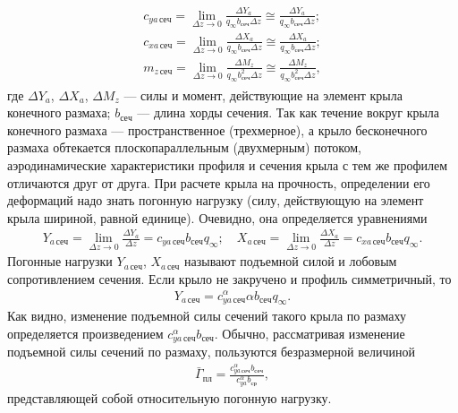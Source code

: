 	\begin{gather}\label{eq:3.7}
		\begin{gathered}
			c_{ya\,\mathrm{сеч}} = \lim_{\Delta z \to 0}\frac{\Delta Y_a}{q_\infty b_\mathrm{сеч}\Delta z} \cong \frac{\Delta Y_a}{q_\infty b_\mathrm{сеч}\Delta z};\\
			c_{xa\,\mathrm{сеч}} = \lim_{\Delta z \to 0}\frac{\Delta X_a}{q_\infty b_\mathrm{сеч}\Delta z} \cong \frac{\Delta X_a}{q_\infty b_\mathrm{сеч}\Delta z};\\
			m_{z\,\mathrm{сеч}} = \lim_{\Delta z \to 0}\frac{\Delta M_z}{q_\infty b_\mathrm{сеч}^2\Delta z} \cong \frac{\Delta M_z}{q_\infty b_\mathrm{сеч}^2\Delta z},
		\end{gathered}
	\end{gather}
	где $\Delta Y_a$, $\Delta X_a$, $\Delta M_z$ --- силы и момент, действующие на элемент крыла конечного размаха; $b_\mathrm{сеч}$ --- длина хорды сечения.\n
	Так как течение вокруг крыла конечного размаха --- пространственное (трехмерное), а крыло бесконечного размаха обтекается плоскопараллельным (двухмерным) потоком, аэродинамические характеристики профиля и сечения крыла с тем же профилем отличаются друг от друга.\n
	При расчете крыла на прочность, определении его деформаций надо знать погонную нагрузку (силу, действующую на элемент крыла шириной, равной единице). Очевидно, она определяется уравнениями
	\begin{gather}\label{eq:3.8}
		Y_{a\,\mathrm{сеч}} = \lim_{\Delta z \to 0}\frac{\Delta Y_a}{\Delta z} = c_{ya\,\mathrm{сеч}}b_\mathrm{сеч}q_\infty;\quad
		X_{a\,\mathrm{сеч}} = \lim_{\Delta z \to 0}\frac{\Delta X_a}{\Delta z} = c_{xa\,\mathrm{сеч}}b_\mathrm{сеч}q_\infty.
	\end{gather}
	Погонные нагрузки $Y_{a\,\mathrm{сеч}}$, $X_{a\,\mathrm{сеч}}$ называют подъемной силой и лобовым сопротивлением сечения.\n
	Если крыло не закручено и профиль симметричный, то
	\begin{gather}\label{eq:3.9}
		Y_{a\,\mathrm{сеч}} = c_{ya\,\mathrm{сеч}}^\alpha\alpha b_\mathrm{сеч} q_\infty.
	\end{gather}
	Как видно, изменение подъемной силы сечений такого крыла по размаху определяется произведением $c_{ya\,\mathrm{сеч}}^\alpha b_\mathrm{сеч}$. Обычно, рассматривая изменение подъемной силы сечений по размаху, пользуются безразмерной величиной
	\begin{gather}\label{eq:3.10}
		\bar{\Gamma}_\mathrm{пл} = \frac{c_{ya\,\mathrm{сеч}}^\alpha b_\mathrm{сеч}}{c_{ya}^\alpha b_\mathrm{ср}},
	\end{gather}
	представляющей собой относительную погонную нагрузку.
	
